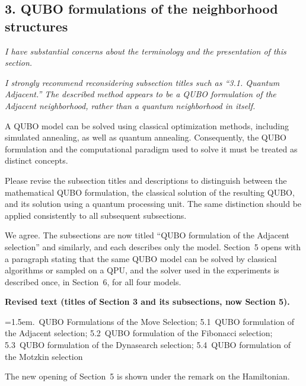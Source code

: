 \documentclass[12pt]{article}
\newenvironment{rc}[1]{\par\medskip\noindent\itshape\renewcommand{\emph}[1]{\textbf{##1}}\ignorespaces}{\par}
\newenvironment{lead}{\par\medskip\noindent\itshape\renewcommand{\emph}[1]{\textbf{##1}}\ignorespaces}{\par}
\newcommand{\answer}[1]{\par\smallskip\noindent #1\par}
\newcommand{\change}[3]{\par\smallskip\noindent\textbf{Revised text (#1).}\par
  {\leftskip=1.5em\noindent#3\par}}
\begin{document}
\subsection*{3. QUBO formulations of the neighborhood structures}

\begin{lead}
I have substantial concerns about the terminology and the presentation of this section.
\end{lead}

\begin{rc}{R2 3 --- Terminology and conceptual distinction}
I strongly recommend reconsidering subsection titles such as ``3.1. Quantum Adjacent.'' The described method appears to be a QUBO formulation of the Adjacent neighborhood, rather than a quantum neighborhood in itself.

A QUBO model can be solved using classical optimization methods, including simulated annealing, as well as quantum annealing. Consequently, the QUBO formulation and the computational paradigm used to solve it must be treated as distinct concepts.

Please revise the subsection titles and descriptions to distinguish between the mathematical QUBO formulation, the classical solution of the resulting QUBO, and its solution using a quantum processing unit. The same distinction should be applied consistently to all subsequent subsections.
\end{rc}
\answer{We agree. The subsections are now titled ``QUBO formulation of the Adjacent selection'' and similarly, and each describes only the model. Section~5 opens with a paragraph stating that the same QUBO model can be solved by classical algorithms or sampled on a QPU, and the solver used in the experiments is described once, in Section~6, for all four models.}
\change{titles of Section 3 and its subsections, now Section 5}{3.~QUBO Formulations; 3.1~Quantum Adjacent; 3.2~Quantum Fibonacci; 3.3~Quantum Motzkin; 3.4~Quantum Dynasearch}{5.~QUBO Formulations of the Move Selection; 5.1~QUBO formulation of the Adjacent selection; 5.2~QUBO formulation of the Fibonacci selection; 5.3~QUBO formulation of the Dynasearch selection; 5.4~QUBO formulation of the Motzkin selection}
The new opening of Section~5 is shown under the remark on the Hamiltonian.
\end{document}
